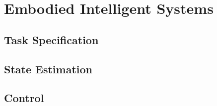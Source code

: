 \chapter{Embodied Intelligent Systems}
\label{chap: embodied intelligent systems}




\section{Task Specification}



\section{State Estimation}



\section{Control}

